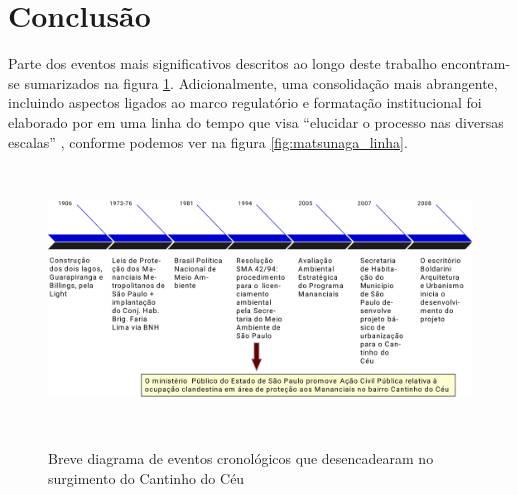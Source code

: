 	\section{Conclusão}

	Parte dos eventos mais significativos descritos ao longo deste trabalho encontram-se sumarizados na figura \ref*{fig:cronologia}. Adicionalmente, uma consolidação mais abrangente, incluindo aspectos ligados ao marco regulatório e formatação institucional foi elaborado por  em uma linha do tempo que visa ``elucidar o processo nas diversas escalas'' \cite[p.37]{Matsunaga2015}, conforme podemos ver na figura \ref*{fig:matsunaga_linha}.
	
	\begin{figure}[H]
		\centering
		\caption[Cronologia do surgimento do Cantinho do Céu]{Breve diagrama de eventos cronológicos que desencadearam no surgimento do Cantinho do Céu}
		\includegraphics[height=7cm]{img/cronologia}
		\label{fig:cronologia}
	\end{figure}
	
